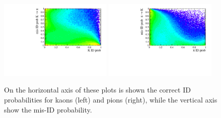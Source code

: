 %
\begin{figure}[h!]
\centering 
\includegraphics[width=0.48\textwidth]{RKst/figs/kaon_PID.pdf}
\includegraphics[width=0.48\textwidth]{RKst/figs/pion_PID.pdf}
\caption{On the horizontal axis of these plots is shown the correct ID
probabilities for kaons (left) and pions (right), while the vertical
axis show the mis-ID probability.}
\label{fig:k_pi_pid}
\end{figure}

